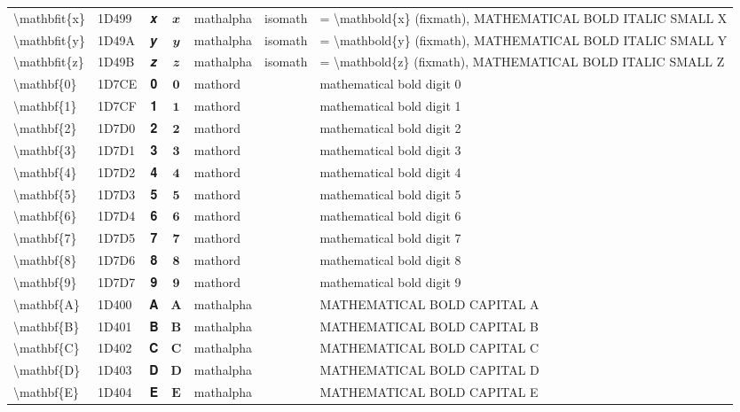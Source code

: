 \documentclass[a4paper,landscape]{article}
\begin{document}
\begin{longtable}{llcclll}
\textbackslash{}mathbfit\{x\} & 1D499 & 𝒙 & $\mathbfit{x}$ & mathalpha & isomath & = \textbackslash{}mathbold\{x\} (fixmath), MATHEMATICAL BOLD ITALIC SMALL X \\
\textbackslash{}mathbfit\{y\} & 1D49A & 𝒚 & $\mathbfit{y}$ & mathalpha & isomath & = \textbackslash{}mathbold\{y\} (fixmath), MATHEMATICAL BOLD ITALIC SMALL Y \\
\textbackslash{}mathbfit\{z\} & 1D49B & 𝒛 & $\mathbfit{z}$ & mathalpha & isomath & = \textbackslash{}mathbold\{z\} (fixmath), MATHEMATICAL BOLD ITALIC SMALL Z \\
\textbackslash{}mathbf\{0\} & 1D7CE & 𝟎 & $\mathbf{0}$ & mathord &  & mathematical bold digit 0 \\
\textbackslash{}mathbf\{1\} & 1D7CF & 𝟏 & $\mathbf{1}$ & mathord &  & mathematical bold digit 1 \\
\textbackslash{}mathbf\{2\} & 1D7D0 & 𝟐 & $\mathbf{2}$ & mathord &  & mathematical bold digit 2 \\
\textbackslash{}mathbf\{3\} & 1D7D1 & 𝟑 & $\mathbf{3}$ & mathord &  & mathematical bold digit 3 \\
\textbackslash{}mathbf\{4\} & 1D7D2 & 𝟒 & $\mathbf{4}$ & mathord &  & mathematical bold digit 4 \\
\textbackslash{}mathbf\{5\} & 1D7D3 & 𝟓 & $\mathbf{5}$ & mathord &  & mathematical bold digit 5 \\
\textbackslash{}mathbf\{6\} & 1D7D4 & 𝟔 & $\mathbf{6}$ & mathord &  & mathematical bold digit 6 \\
\textbackslash{}mathbf\{7\} & 1D7D5 & 𝟕 & $\mathbf{7}$ & mathord &  & mathematical bold digit 7 \\
\textbackslash{}mathbf\{8\} & 1D7D6 & 𝟖 & $\mathbf{8}$ & mathord &  & mathematical bold digit 8 \\
\textbackslash{}mathbf\{9\} & 1D7D7 & 𝟗 & $\mathbf{9}$ & mathord &  & mathematical bold digit 9 \\
\textbackslash{}mathbf\{A\} & 1D400 & 𝐀 & $\mathbf{A}$ & mathalpha &  & MATHEMATICAL BOLD CAPITAL A \\
\textbackslash{}mathbf\{B\} & 1D401 & 𝐁 & $\mathbf{B}$ & mathalpha &  & MATHEMATICAL BOLD CAPITAL B \\
\textbackslash{}mathbf\{C\} & 1D402 & 𝐂 & $\mathbf{C}$ & mathalpha &  & MATHEMATICAL BOLD CAPITAL C \\
\textbackslash{}mathbf\{D\} & 1D403 & 𝐃 & $\mathbf{D}$ & mathalpha &  & MATHEMATICAL BOLD CAPITAL D \\
\textbackslash{}mathbf\{E\} & 1D404 & 𝐄 & $\mathbf{E}$ & mathalpha &  & MATHEMATICAL BOLD CAPITAL E \\

\end{longtable}
\end{document}
